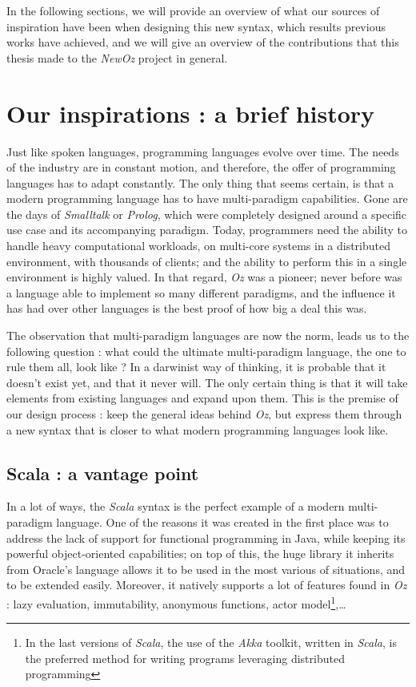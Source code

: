 In the following sections, we will provide an overview of what our sources of inspiration have been when designing this new syntax, which results previous works have achieved, and we will give an overview of the contributions that this thesis made to the \textit{NewOz} project in general.

\section{Our inspirations : a brief history}\label{sec:ch1-inspirations}

Just like spoken languages, programming languages evolve over time.
The needs of the industry are in constant motion, and therefore, the offer of programming languages has to adapt constantly.
The only thing that seems certain, is that a modern programming language has to have multi-paradigm capabilities.
Gone are the days of \textit{Smalltalk} or \textit{Prolog}, which were completely designed around a specific use case and its accompanying paradigm.
Today, programmers need the ability to handle heavy computational workloads, on multi-core systems in a distributed environment, with thousands of clients;
and the ability to perform this in a single environment is highly valued.
In that regard, \textit{Oz} was a pioneer;
never before was a language able to implement so many different paradigms, and the influence it has had over other languages is the best proof of how big a deal this was.\newline

The observation that multi-paradigm languages are now the norm, leads us to the following question : what could the ultimate multi-paradigm language, the one to rule them all, look like ?
In a darwinist way of thinking, it is probable that it doesn't exist yet, and that it never will.
The only certain thing is that it will take elements from existing languages and expand upon them.
This is the premise of our design process : keep the general ideas behind \textit{Oz}, but express them through a new syntax that is closer to what modern programming languages look like.

\subsection{Scala : a vantage point}\label{subsec:ch1-scala}
In a lot of ways, the \textit{Scala} syntax is the perfect example of a modern multi-paradigm language.
One of the reasons it was created in the first place was to address the lack of support for functional programming in Java, while keeping its powerful object-oriented capabilities;
on top of this, the huge library it inherits from Oracle's language allows it to be used in the most various of situations, and to be extended easily.
Moreover, it natively supports a lot of features found in \textit{Oz} : lazy evaluation, immutability, anonymous functions, actor model\footnote{In the last versions of \textit{Scala}, the use of the \textit{Akka} toolkit\cite{akka}, written in \textit{Scala}, is the preferred method for writing programs leveraging distributed programming},\ldots\newline

